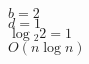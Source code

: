 \documentclass{article}
\begin{document}
                                                                                                                                                                                                                                                                                                                                                                                                                                                                                                                                                                                                                                                                                                                                                                                                        $b=2$\\
                                                                                                                                                                                                                                                                                                                                                                                                                                                                                                                                                                                                                                                                                                                                                                                                                $d=1$\\
                                                                                                                                                                                                                                                                                                                                                                                                                                                                                                                                                                                                                                                                                                                                                                                                                        $\log{_2}{2} = 1$\\
                                                                                                                                                                                                                                                                                                                                                                                                                                                                                                                                                                                                                                                                                                                                                                                                                                $O(n\log{n})$ \\
\end{document}
